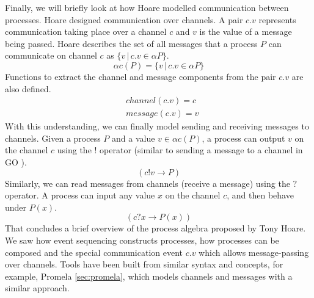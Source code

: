 \par
Finally, we will briefly look at how Hoare modelled communication between processes. Hoare designed communication over channels. A pair $c.v$ represents communication taking place over a channel $c$ and $v$ is the value of a message being passed. Hoare describes the set of all messages that a process $P$ can communicate on channel $c$ as $\{ v \,|\, c.v \in \alpha P \}.$
\[
\alpha c(P) = \{ v \,|\, c.v \in \alpha P \}
\]
Functions to extract the channel and message components from the pair $c.v$ are also defined.
\[
\begin{aligned}
& channel(c.v) = c \\
& message(c.v) = v
\end{aligned}
\]
With this understanding, we can finally model sending and receiving messages to channels. Given a process $P$ and a value $v \in \alpha c(P)$, a process can output $v$ on the channel $c$ using the $!$ operator (similar to sending a message to a channel in GO \cite{go}).
\[
(c!v \rightarrow P)
\]
Similarly, we can read messages from channels (receive a message) using the $?$ operator. A process can input any value $x$ on the channel $c$, and then behave under $P(x)$.
\[
(c?x \rightarrow P(x))
\]
That concludes a brief overview of the process algebra proposed by Tony Hoare. We saw how event sequencing constructs processes, how processes can be composed and the special communication event $c.v$ which allows message-passing over channels. Tools have been built from similar syntax and concepts, for example, Promela \ref{sec:promela}, which models channels and messages with a similar approach.
